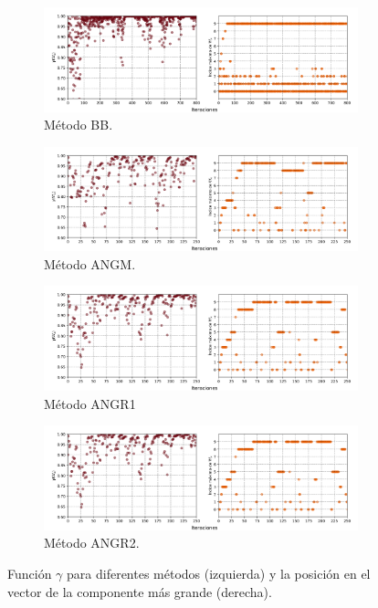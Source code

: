 \begin{frame}
    \vspace{0.5cm}
    \begin{figure}[H]
        \begin{subfigure}{7cm}
            \includegraphics[width=1\textwidth]{Graphics/gamma/barzilai.png}
            \caption{Método BB.}
        \end{subfigure}
        \begin{subfigure}{7cm}
            \includegraphics[width=1\textwidth]{Graphics/gamma/ANGM.png}
            \caption{Método ANGM.}
        \end{subfigure}
        \begin{subfigure}{7cm}
            \includegraphics[width=1\textwidth]{Graphics/gamma/ANGR1.png}
            \caption{Método ANGR1}
        \end{subfigure}
        \begin{subfigure}{7cm}
            \includegraphics[width=1\textwidth]{Graphics/gamma/ANGR1.png}
            \caption{Método ANGR2.}
        \end{subfigure}
        \caption{\small Función $\gamma$ para diferentes métodos (izquierda) y la posición en el vector de la componente más grande (derecha).}
        \label{fig:gamma}
    \end{figure}
\end{frame}

